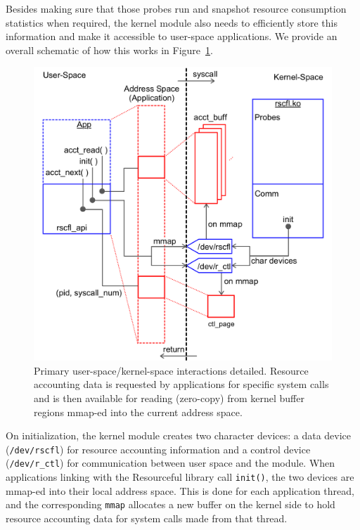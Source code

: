 \documentclass[letterpaper,twocolumn,10pt]{article}
\newcommand{\pname}{Resourceful}
\begin{document}
Besides making sure that those probes run and snapshot resource consumption statistics
when required, the kernel module also needs to efficiently store this information
and make it accessible to user-space applications. We provide an overall schematic of
how this works in Figure~\ref{fig:design}.

\begin{figure}[ht!] 
	\centering
	\hspace*{-0.07\columnwidth} 
	\includegraphics[width=1.1\columnwidth]{sys_design}
	\caption{Primary user-space/kernel-space interactions detailed. Resource
accounting data is requested by applications for specific system calls and is
then available for reading (zero-copy) from kernel buffer regions mmap-ed into
the current address space. } 
	\label{fig:design}
\end{figure}

On initialization, the kernel module creates two character devices: a data
device (\texttt{/dev/rscfl}) for resource accounting information and a control
device (\texttt{/dev/r\_ctl}) for communication between user space and the
module. When applications linking with the \pname{ }library call
\texttt{init()}, the two devices are mmap-ed into their local address space. This
is done for each application thread, and the corresponding \texttt{mmap}
allocates a new buffer on the kernel side to hold resource accounting data for
system calls made from that thread.
\end{document}
